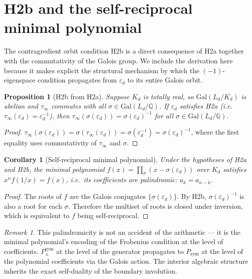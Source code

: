 \documentclass[12pt]{article}
\theoremstyle{plain}
\newtheorem{corollaryinner}[theoreminner]{Corollary}
\newtheorem{propositioninner}[theoreminner]{Proposition}
\theoremstyle{definition}
\theoremstyle{remark}
\newtheorem{remark}[theoreminner]{Remark}
\newenvironment{corollary}{\begin{mdframed}[style=thmstyle]\begin{corollaryinner}}{\end{corollaryinner}\end{mdframed}}
\newenvironment{proposition}{\begin{mdframed}[style=thmstyle]\begin{propositioninner}}{\end{propositioninner}\end{mdframed}}
\newcommand{\Gal}{\mathrm{Gal}}
\newcommand{\bQ}{\mathbb{Q}}
\newcommand{\tauinf}{\tau_\infty}
\newcommand{\epsd}{\varepsilon_d}
\begin{document}
\section{H2b and the self-reciprocal minimal polynomial}
\label{sec:h2b}

The contragredient orbit condition H2b is a direct consequence of H2a together with the
commutativity of the Galois group. We include the derivation here because it makes explicit
the structural mechanism by which the $(-1)$-eigenspace condition propagates from $\epsd$ to
its entire Galois orbit.

\begin{proposition}[H2b from H2a]
Suppose $K_d$ is totally real, so $\Gal(L_d/K_d)$ is abelian and $\tauinf$ commutes with all
$\sigma \in \Gal(L_d/\bQ)$. If $\epsd$ satisfies H2a (i.e.\ $\tauinf(\epsd) = \epsd^{-1}$),
then $\tauinf(\sigma(\epsd)) = \sigma(\epsd)^{-1}$ for all $\sigma \in \Gal(L_d/\bQ)$.
\end{proposition}

\begin{proof}
$\tauinf(\sigma(\epsd)) = \sigma(\tauinf(\epsd)) = \sigma(\epsd^{-1}) = \sigma(\epsd)^{-1}$,
where the first equality uses commutativity of $\tauinf$ and $\sigma$.
\end{proof}

\begin{corollary}[Self-reciprocal minimal polynomial]
Under the hypotheses of H2a and H2b, the minimal polynomial $f(x) = \prod_\sigma (x -
\sigma(\epsd))$ over $K_d$ satisfies $x^n f(1/x) = f(x)$, i.e.\ its coefficients are
palindromic: $a_k = a_{n-k}$.
\end{corollary}

\begin{proof}
The roots of $f$ are the Galois conjugates $\{\sigma(\epsd)\}$. By H2b, $\sigma(\epsd)^{-1}$
is also a root for each $\sigma$. Therefore the multiset of roots is closed under inversion,
which is equivalent to $f$ being self-reciprocal.
\end{proof}

\begin{remark}
This palindromicity is not an accident of the arithmetic — it is the minimal polynomial's
encoding of the Frobenius condition at the level of coefficients. $P_{\pm}^{\text{sym}}$ at
the level of the generator propagates to $P_{\text{sym}}$ at the level of the polynomial
coefficients via the Galois action. The interior algebraic structure inherits the exact
self-duality of the boundary involution.
\end{remark}
\end{document}
